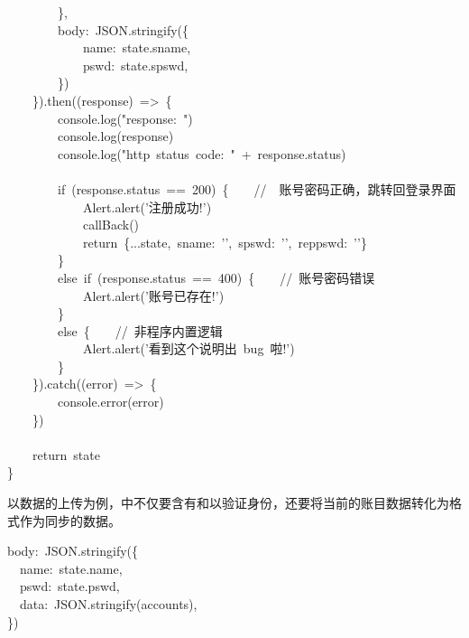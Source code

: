 \documentclass{article}
\begin{document}
\begin{mdpre}
~~~~~~~~\},\\
~~~~~~~~body:~JSON.stringify(\{\\
~~~~~~~~~~~~name:~state.sname,\\
~~~~~~~~~~~~pswd:~state.spswd,\\
~~~~~~~~\})\\
~~~~\}).then((response)~=\textgreater{}~\{\\
~~~~~~~~console.log({"}{response:~}{"})\\
~~~~~~~~console.log(response)\\
~~~~~~~~console.log({"}{http~status~code:~}{"}~+~response.status)\\
\\
~~~~~~~~{if}~(response.status~==~{200})~\{~~~~{//　账号密码正确，跳转回登录界面}\\
~~~~~~~~~~~~Alert.alert({'}{注册成功!}{'})\\
~~~~~~~~~~~~callBack()\\
~~~~~~~~~~~~{return}~\{...state,~sname:~{'}{'},~spswd:~{'}{'},~reppswd:~{'}{'}\}\\
~~~~~~~~\}\\
~~~~~~~~{else}~{if}~(response.status~==~{400})~\{~~~~{//~账号密码错误}\\
~~~~~~~~~~~~Alert.alert({'}{账号已存在!}{'})\\
~~~~~~~~\}\\
~~~~~~~~{else}~\{~~~~{//~非程序内置逻辑}\\
~~~~~~~~~~~~Alert.alert({'}{看到这个说明出~bug~啦!}{'})\\
~~~~~~~~\}\\
~~~~\}).{catch}((error)~=\textgreater{}~\{\\
~~~~~~~~console.error(error)\\
~~~~\})\\
\\
~~~~{return}~state\\
\}%
\end{mdpre}\noindent{}以数据的上传为例，中不仅要含有和以验证身份，还要将当前的账目数据转化为格式作为同步的数据。
\begin{mdpre}%
\noindent body:~JSON.stringify(\{\\
~~name:~state.name,\\
~~pswd:~state.pswd,\\
~~data:~JSON.stringify(accounts),\\
\})%
\end{mdpre}
\end{document}

